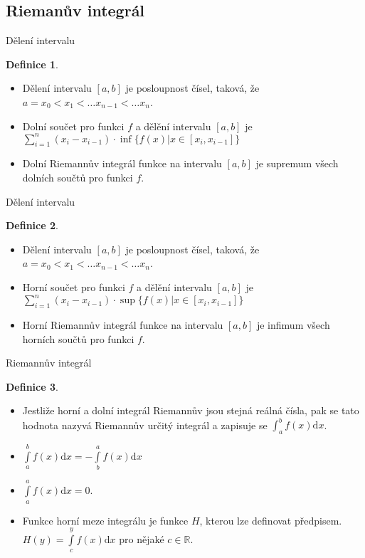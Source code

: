 \documentclass{beamer}
\theoremstyle{definition}
\newtheorem{dfn}{Definice}
\theoremstyle{example}
\def\R{\mathbb{R}}
\def\d{\mathrm{d}}
\begin{document}
\subsection{Riemanův integrál}
\begin{frame}{Dělení intervalu}
	\begin{dfn}
		\begin{itemize}
			\item Dělení intervalu $[a, b]$ je posloupnost čísel, taková, že $a = x_0 < x_1 < \dots x_{n - 1} < \dots x_n$.
			\item Dolní součet pro funkci $f$ a dělění intervalu $[a, b]$ je $\sum\limits_{i = 1}^n (x_i - x_{i - 1})\cdot \inf \{f(x) | x \in [x_i, x_{i - 1}]\}$
			\item Dolní Riemannův integrál funkce na intervalu $[a, b]$ je supremum všech dolních součtů pro funkci $f$.
		\end{itemize}
	\end{dfn}
\end{frame}

\begin{frame}{Dělení intervalu}
	\begin{dfn}
		\begin{itemize}
			\item Dělení intervalu $[a, b]$ je posloupnost čísel, taková, že $a = x_0 < x_1 < \dots x_{n - 1} < \dots x_n$.
			\item Horní součet pro funkci $f$ a dělění intervalu $[a, b]$ je $\sum\limits_{i = 1}^n (x_i - x_{i - 1})\cdot \sup \{f(x) | x \in [x_i, x_{i - 1}]\}$
			\item Horní Riemannův integrál funkce na intervalu $[a, b]$ je infimum všech horních součtů pro funkci $f$.
		\end{itemize}
	\end{dfn}
\end{frame}

\begin{frame}{Riemannův integrál}
	\begin{dfn}
		\begin{itemize}
			\item Jestliže horní a dolní integrál Riemannův jsou stejná reálná čísla, pak se tato hodnota nazyvá Riemannův určitý integrál a zapisuje se $\int_a^b f(x) \d x$.
			\item $\int\limits_a^b f(x) \d x = - \int\limits_b^a f(x) \d x$
			\item $\int\limits_a^a f(x) \d x = 0$.
			\item Funkce horní meze integrálu je funkce $H$, kterou lze definovat předpisem. $H(y) = \int\limits_c^y f(x) \d x$ pro nějaké $c \in \R$.
		\end{itemize}
	\end{dfn}
\end{frame}
\end{document}
